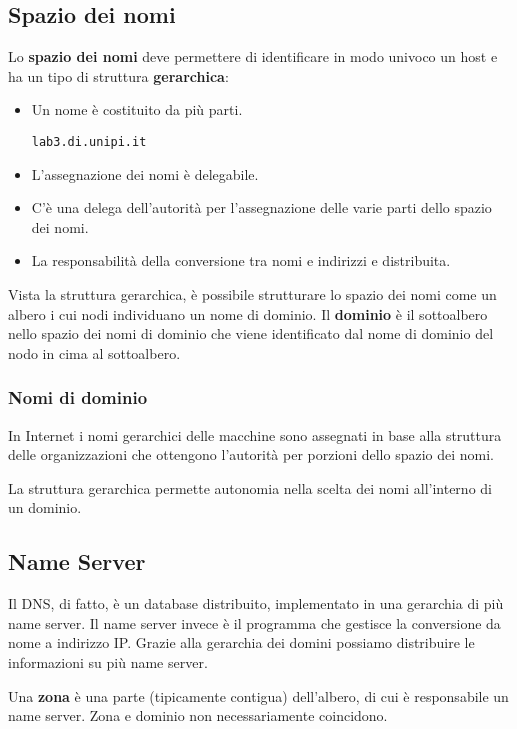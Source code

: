 \subsection{Spazio dei nomi}
Lo \textbf{spazio dei nomi} deve permettere di identificare in modo 
univoco un host e ha un tipo di struttura \textbf{gerarchica}:
\begin{itemize}
	\item Un nome è costituito da più parti.
	      \begin{center} \verb|lab3.di.unipi.it| \end{center}
	\item L'assegnazione dei nomi è delegabile.
	\item C'è una delega dell'autorità per l'assegnazione delle varie 
		parti dello spazio dei nomi.
	\item La responsabilità della conversione tra nomi e indirizzi e 
		distribuita.
\end{itemize}
Vista la struttura gerarchica, è possibile strutturare lo spazio dei 
nomi come un albero i cui nodi individuano un nome di dominio. Il 
\textbf{dominio} è il sottoalbero nello spazio dei nomi di dominio che 
viene identificato dal nome di dominio del nodo in cima al sottoalbero.

\subsubsection{Nomi di dominio}
In Internet i nomi gerarchici delle macchine sono assegnati in base 
alla struttura delle organizzazioni che ottengono l'autorità per 
porzioni dello spazio dei nomi.

La struttura gerarchica permette autonomia nella scelta dei nomi 
all'interno di un dominio.

\subsection{Name Server}
Il DNS, di fatto, è un database distribuito, implementato in una 
gerarchia di più name server. Il name server invece è il programma che 
gestisce la conversione da nome a indirizzo IP. Grazie alla gerarchia 
dei domini possiamo distribuire le informazioni su più name server.

Una \textbf{zona} è una parte (tipicamente contigua) dell'albero, di 
cui è responsabile un name server. Zona e dominio non necessariamente 
coincidono.

